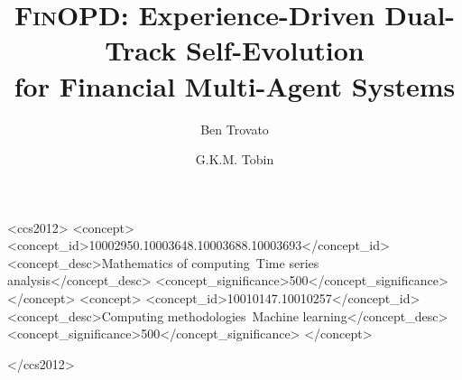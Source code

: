 \documentclass[sigconf,anonymous,review]{acmart}
\title{\textsc{FinOPD}: Experience-Driven Dual-Track Self-Evolution\\for Financial Multi-Agent Systems}
\author{Ben Trovato}
\author{G.K.M. Tobin}
\affiliation{%
  \institution{Institute for Clarity in Documentation}
  \city{Dublin}
  \state{Ohio}
  \country{USA}
}
\begin{document}


\begin{CCSXML}
<ccs2012>
  <concept>
    <concept_id>10002950.10003648.10003688.10003693</concept_id>
    <concept_desc>Mathematics of computing~Time series analysis</concept_desc>
    <concept_significance>500</concept_significance>
  </concept>
  <concept>
    <concept_id>10010147.10010257</concept_id>
    <concept_desc>Computing methodologies~Machine learning</concept_desc>
    <concept_significance>500</concept_significance>
  </concept>

</ccs2012>
\end{CCSXML}



\maketitle  











\newpage
\appendix

\end{document}
